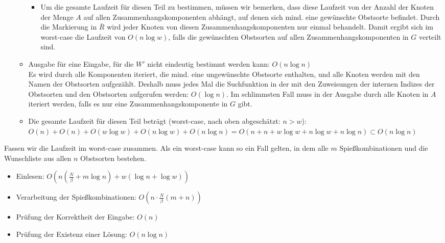 \begin{itemize}
\begin{itemize}
\begin{itemize}
    \item Um die gesamte Laufzeit für diesen Teil zu bestimmen, müssen wir bemerken, dass 
    diese Laufzeit von der Anzahl der Knoten der Menge $A$ auf allen Zusammenhangskomponenten 
    abhängt, auf denen sich mind. eine gewünschte Obstsorte befindet. Durch die Markierung
    in $\bar{R}$ wird jeder Knoten von diesen Zusammenhangskomponenten nur einmal behandelt. 
    Damit ergibt sich im worst-case die Laufzeit von $O(n \log w)$, falls die gewünschten Obstsorten auf 
    allen Zusammenhangskomponenten in $G$ verteilt sind.
    \end{itemize}

    \item Ausgabe für eine Eingabe, für die $W'$ nicht eindeutig bestimmt werden kann: $O(n \log n)$\\
    Es wird durch alle Komponenten iteriert, die mind. eine ungewünschte Obstsorte enthalten,
    und alle Knoten werden mit den Namen der Obstsorten aufgezählt.
    Deshalb muss jedes Mal die Suchfunktion in der  mit den Zuweisungen 
    der internen Indizes der Obstsorten und den Obstsorten aufgerufen werden: $O(\log n)$.
    Im schlimmsten Fall muss in der Ausgabe durch alle Knoten in $A$ iteriert werden, falls
    es nur eine Zusammenhangskomponente in $G$ gibt.

    \item Die gesamte Laufzeit für diesen Teil beträgt (worst-case, nach oben abgeschätzt: $n > w$):
    $O(n) + O(n) + O(w \log w) + O(n \log w) + O(n \log n) = O(n + n + w \log w + n \log w + n \log n)
    \subset O(n \log n)$
  \end{itemize}

\end{itemize}

Fassen wir die Laufzeit im worst-case zusammen. Als ein worst-case kann so ein Fall gelten,
in dem alle $m$ Spießkombinationen und die Wunschliste aus allen $n$ Obstsorten bestehen. 
\begin{itemize}
  \item Einlesen: $O(n (\frac{N}{\beta} + m \log n) + w (\log n + \log w))$
  \item Verarbeitung der Spießkombinationen: $O(n\cdot \frac{N}{\beta}(m + n))$
  \item Prüfung der Korrektheit der Eingabe: $O(n)$
  \item Prüfung der Existenz einer Lösung: $O(n \log n)$
\end{itemize}

